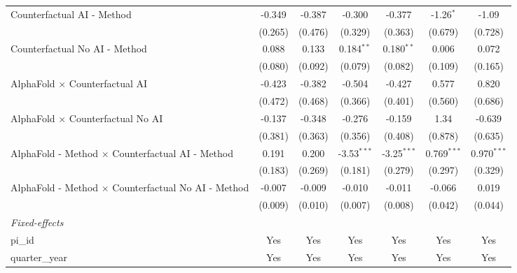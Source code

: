 \begin{tabular}{lcccccc}
   Counterfactual AI - Method                                 & -0.349  & -0.387  & -0.300        & -0.377        & -1.26$^{*}$   & -1.09\\   
                                                              & (0.265) & (0.476) & (0.329)       & (0.363)       & (0.679)       & (0.728)\\   
   Counterfactual No AI - Method                              & 0.088   & 0.133   & 0.184$^{**}$  & 0.180$^{**}$  & 0.006         & 0.072\\   
                                                              & (0.080) & (0.092) & (0.079)       & (0.082)       & (0.109)       & (0.165)\\   
   AlphaFold $\times$ Counterfactual AI                       & -0.423  & -0.382  & -0.504        & -0.427        & 0.577         & 0.820\\   
                                                              & (0.472) & (0.468) & (0.366)       & (0.401)       & (0.560)       & (0.686)\\   
   AlphaFold $\times$ Counterfactual No AI                    & -0.137  & -0.348  & -0.276        & -0.159        & 1.34          & -0.639\\   
                                                              & (0.381) & (0.363) & (0.356)       & (0.408)       & (0.878)       & (0.635)\\   
   AlphaFold - Method $\times$ Counterfactual AI - Method     & 0.191   & 0.200   & -3.53$^{***}$ & -3.25$^{***}$ & 0.769$^{***}$ & 0.970$^{***}$\\   
                                                              & (0.183) & (0.269) & (0.181)       & (0.279)       & (0.297)       & (0.329)\\   
   AlphaFold - Method $\times$ Counterfactual No AI - Method  & -0.007  & -0.009  & -0.010        & -0.011        & -0.066        & 0.019\\   
                                                              & (0.009) & (0.010) & (0.007)       & (0.008)       & (0.042)       & (0.044)\\   
   \midrule
   \emph{Fixed-effects}\\
   pi\_id                                                     & Yes     & Yes     & Yes           & Yes           & Yes           & Yes\\  
   quarter\_year                                              & Yes     & Yes     & Yes           & Yes           & Yes           & Yes\\  

\end{tabular}
